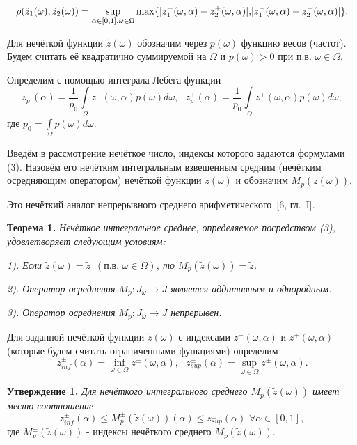 \begin{equation*}
\rho(\tilde{z}_1(\omega), \tilde{z}_2(\omega)) = \sup\limits_{\alpha\in[0,1], \omega\in\Omega}\max\{|z_1^{+}(\omega, \alpha) - z_2^{+}(\omega, \alpha)|, $$$$|z_1^{-}(\omega, \alpha) - z_2^{-}(\omega, \alpha)|\}.
\end{equation*}




Для нечёткой функции $\tilde{z}(\omega)$ обозначим через $p(\omega)$ функцию весов (частот).  Будем считать её квадратично суммируемой на $\Omega$ и $p(\omega)>0$ при п.в. $\omega\in\Omega$.

Определим с помощью интеграла Лебега функции
\begin{equation}
z^{-}_{p}(\alpha) = \frac{1}{p_0}\int\limits_{\Omega}z^{-}(\omega, \alpha)p(\omega)d\omega,\,\,\,\,z^{+}_{p}(\alpha) = \frac{1}{p_0}\int\limits_{\Omega}z^{+}(\omega, \alpha)p(\omega)d\omega,
\end{equation}
где $p_0 = \int\limits_{\Omega}p(\omega)d\omega$.


Введём в рассмотрение нечёткое число, индексы которого задаются формулами (3). Назовём его нечётким интегральным взвешенным средним (нечётким осредняющим оператором) нечёткой функции $\tilde{z}(\omega)$ и обозначим $M_p(\tilde{z}(\omega))$.

Это нечёткий аналог непрерывного среднего арифметического~[6, гл.~{I}].


\textbf{Теорема 1.} \textit{Нечёткое интегральное среднее, определяемое посредством (3), удовлетворяет следующим условиям:}

\textit{1). Если $\tilde{z}(\omega) = \tilde{z}\,\,\,(\text{п.в.}\,\,\omega\in\Omega)$, то $M_p(\tilde{z}(\omega)) = \tilde{z}$.
}

\textit{2). Оператор осреднения $M_p: J_{\omega}\rightarrow J$ является аддитивным и однородным.
}

\textit{3). Оператор осреднения $M_p: J_{\omega}\rightarrow J$ непрерывен.
}


Для заданной нечёткой функции $\tilde{z}(\omega)$ с индексами $z^{-}(\omega, \alpha)$ и $z^{+}(\omega, \alpha)$ (которые будем считать ограниченными функциями) определим
$$
z_{inf}^{\pm}(\alpha)=\inf\limits_{\omega\in\Omega}z^{\pm}(\omega, \alpha),\,\,\,\,z_{sup}^{\pm}(\alpha)=\sup\limits_{\omega\in\Omega}z^{\pm}(\omega, \alpha).
$$

\textbf{Утверждение 1.} \textit{Для нечёткого интегрального среднего $M_p(\tilde{z}(\omega))$ имеет место соотношение }
$$
z_{inf}^{\pm}(\alpha)\leq M_p^{\pm}(\tilde{z}(\omega))(\alpha) \leq z_{sup}^{\pm}(\alpha)\,\,\forall\alpha\in[0, 1],
$$
где $M_p^{\pm}(\tilde{z}(\omega))$ - индексы нечёткого среднего $M_p(\tilde{z}(\omega))$.



